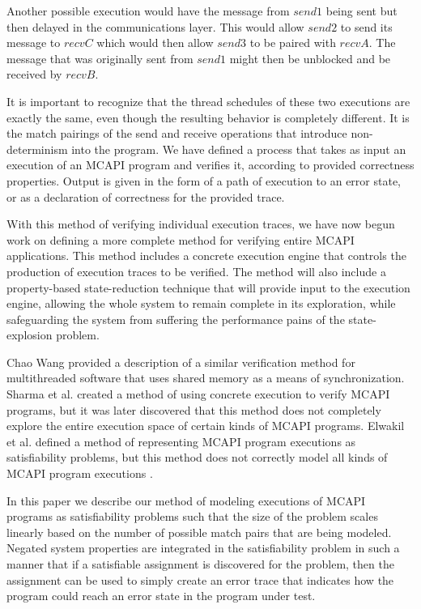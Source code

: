 Another possible execution would have the message from $\mathit{send1}$ being
sent but then delayed in the communications layer. This would allow
$\mathit{send2}$ to send its message to $\mathit{recvC}$ which would then allow
$\mathit{send3}$ to be paired with $\mathit{recvA}$. The message that was
originally sent from $\mathit{send1}$ might then be unblocked and be received
by $\mathit{recvB}$.

It is important to recognize that the thread schedules of these two executions
are exactly the same, even though the resulting behavior is completely
different. It is the match pairings of the send and receive operations that
introduce non-determinism into the program. We have defined a process that
takes as input an execution of an MCAPI program and verifies it, according to
provided correctness properties. Output is given in the form of a path of
execution to an error state, or as a declaration of correctness for the
provided trace.

With this method of verifying individual execution traces, we have now begun
work on defining a more complete method for verifying entire MCAPI
applications. This method includes a concrete execution engine that controls
the production of execution traces to be verified. The method will also include
a property-based state-reduction technique that will provide input to the
execution engine, allowing the whole system to remain complete in its
exploration, while safeguarding the system from suffering the performance pains
of the state-explosion problem.

Chao Wang provided a description of a similar verification method for
multithreaded software that uses shared memory as a means of synchronization.
Sharma et al. created a method of using concrete execution to verify MCAPI
programs, but it was later discovered that this method does not completely
explore the entire execution space of certain kinds of MCAPI programs. Elwakil
et al. defined a method of representing MCAPI program executions as
satisfiability problems, but this method does not correctly model all kinds of
MCAPI program executions \cite{elwakil:padtad10}
.

In this paper we describe our method of modeling executions of MCAPI programs
as satisfiability problems such that the size of the problem scales linearly
based on the number of possible match pairs that are being modeled. Negated
system properties are integrated in the satisfiability problem in such a manner
that if a satisfiable assignment is discovered for the problem, then the
assignment can be used to simply create an error trace that indicates how the
program could reach an error state in the program under test.

